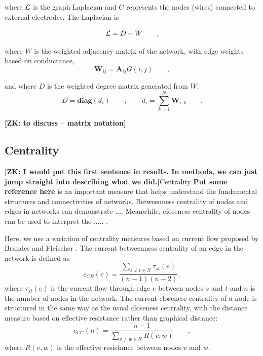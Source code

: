\documentclass[fleqn,10pt,  reprint, amsmath,amssymb,aps, floatfix]{wlscirep}
\begin{document}
where $\cal L$ is the graph Laplacian and $C$ represents the nodes (wires) connected to external electrodes. The Laplacian is

\begin{equation}
{\cal L} = D - W \qquad ,
\end{equation}

where $W$ is the weighted adjacency matrix of the network, with edge weights based on conductance,
\begin{equation}
	\mathbf W_{ij} = \mathbf A_{ij} G(i,j) \qquad ,
\end{equation}

and where $D$ is the weighted degree matrix generated from $W$:
\begin{equation}
		 D = \textbf{diag}(d_i) \qquad , \qquad d_i = \sum \limits_{k=1}^{N} \mathbf W_{i,k} \qquad .
\end{equation}

\textbf{[ZK: to discuss -- matrix notation]}


\subsection*{Centrality}
\textbf{[ZK: I would put this first sentence in results. In methods, we can just jump straight into describing what we did.]}Centrality \textbf{Put some reference here} is an important measure that helps understand the fundamental structures and connectivities of networks. Betweenness centrality of nodes and edges in networks can demonstrate .... Meanwhile, closeness centrality of nodes can be used to interpret the ..... \cite{Newman2010}.

Here, we use a variation of centrality measures based on current flow proposed by Brandes and Fleischer \cite{Brandes2005}.
The current betweenness centrality of an edge in the network is defined as
\begin{equation}
c_{CB}(e) = \frac{\sum \limits_{s \neq t \in N}\tau_{st}(e)}{(n-1)(n-2)},
\label{eq:ebc}
\end{equation}
where $\tau_{st}(e)$ is the current flow through edge $e$ between nodes $s$ and $t$ and $n$ is the number of nodes in the network.
The current closeness centrality of a node is structured in the same way as the usual closeness centrality, with the distance measure based on effective resistance rather than graphical distance:
\begin{equation}
	c_{CC}(n) = \frac{n-1}{\sum \limits_{v \neq w \in N} R(v,w)} \qquad ,
	\label{eq:ecc}
\end{equation}
where $R(v,w)$ is the effective resistance between nodes $v$ and $w$.
\end{document}

